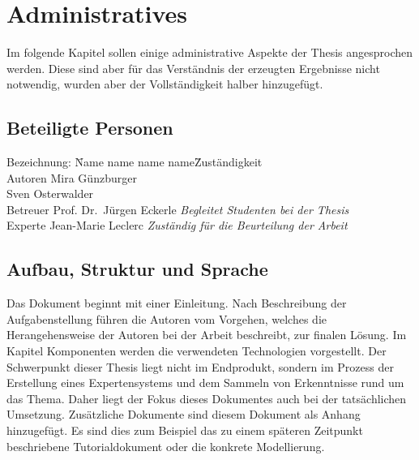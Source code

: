 \chapter{Administratives}
\label{chap:administratives}

Im folgende Kapitel sollen einige administrative Aspekte der Thesis angesprochen werden. Diese sind aber für das Verständnis der erzeugten Ergebnisse nicht notwendig, wurden aber der Vollständigkeit halber hinzugefügt.

\section{Beteiligte Personen}
\label{sec:admin_beteiligte}
\begin{tabbing} %
Bezeichnung: \= Name name name name\= Zuständigkeit \kill \\
    Autoren         \> Mira Günzburger\protect\footnotemark[1]{}    \> \\
                    \> Sven Osterwalder\protect\footnotemark[2]{} \> \\
    Betreuer        \> Prof. Dr.\ Jürgen Eckerle\protect\footnotemark[3]{}  \> \textit{Begleitet Studenten bei der Thesis}\\
    Experte         \> Jean-Marie Leclerc   \> \textit{Zuständig für die Beurteilung der Arbeit}
\end{tabbing}

\section{Aufbau, Struktur und Sprache}
\label{sec:admin_aufbau}
Das Dokument beginnt mit einer Einleitung. Nach Beschreibung der Aufgabenstellung führen die Autoren vom Vorgehen, welches die Herangehensweise der Autoren bei der Arbeit beschreibt, zur finalen Lösung. Im Kapitel Komponenten werden die verwendeten Technologien vorgestellt. Der Schwerpunkt dieser Thesis liegt nicht im Endprodukt,  sondern im Prozess der Erstellung eines Expertensystems und dem Sammeln von Erkenntnisse rund um das Thema. Daher liegt der Fokus dieses Dokumentes auch bei der tatsächlichen Umsetzung. Zusätzliche Dokumente sind diesem Dokument als Anhang hinzugefügt. Es sind dies zum Beispiel das zu einem späteren Zeitpunkt beschriebene Tutorialdokument oder die konkrete Modellierung.

